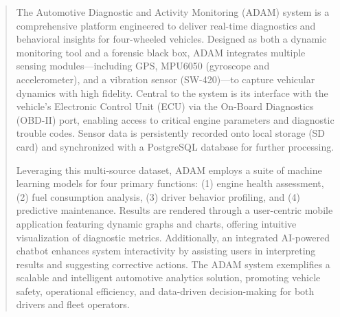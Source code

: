 \begin{abstract}
The Automotive Diagnostic and Activity Monitoring (ADAM) system is a comprehensive platform engineered to deliver real-time diagnostics and behavioral insights for four-wheeled vehicles. Designed as both a dynamic monitoring tool and a forensic black box, ADAM integrates multiple sensing modules—including GPS, MPU6050 (gyroscope and accelerometer), and a vibration sensor (SW-420)—to capture vehicular dynamics with high fidelity. Central to the system is its interface with the vehicle’s Electronic Control Unit (ECU) via the On-Board Diagnostics (OBD-II) port, enabling access to critical engine parameters and diagnostic trouble codes. Sensor data is persistently recorded onto local storage (SD card) and synchronized with a PostgreSQL database for further processing.

Leveraging this multi-source dataset, ADAM employs a suite of machine learning models for four primary functions: (1) engine health assessment, (2) fuel consumption analysis, (3) driver behavior profiling, and (4) predictive maintenance. Results are rendered through a user-centric mobile application featuring dynamic graphs and charts, offering intuitive visualization of diagnostic metrics. Additionally, an integrated AI-powered chatbot enhances system interactivity by assisting users in interpreting results and suggesting corrective actions. The ADAM system exemplifies a scalable and intelligent automotive analytics solution, promoting vehicle safety, operational efficiency, and data-driven decision-making for both drivers and fleet operators.
\end{abstract}